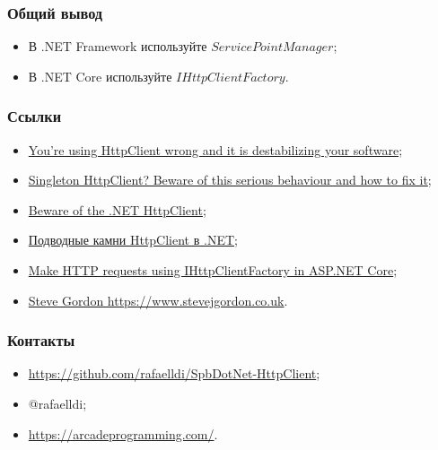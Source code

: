 \documentclass[17pt,aspectratio=169]{beamer}
\begin{document}
\begin{frame}
\frametitle{Общий вывод}
\begin{itemize}
	\item В .NET Framework используйте $ServicePointManager$;
	\item В .NET Core используйте $IHttpClientFactory$.
\end{itemize}
\end{frame}

\begin{frame}
\frametitle{Ссылки}
\begin{itemize}
	\item \href{https://aspnetmonsters.com/2016/08/2016-08-27-httpclientwrong/}{You're using HttpClient wrong and it is destabilizing your software};
	\item \href{https://byterot.blogspot.com/2016/07/singleton-httpclient-dns.html}{Singleton HttpClient? Beware of this serious behaviour and how to fix it};
	\item \href{https://nima-ara-blog.azurewebsites.net/beware-of-the-net-httpclient/}{Beware of the .NET HttpClient};
	\item \href{https://habr.com/en/post/424873/}{Подводные камни HttpClient в .NET};
	\item \href{https://docs.microsoft.com/en-us/aspnet/core/fundamentals/http-requests?view=aspnetcore-2.2}{Make HTTP requests using IHttpClientFactory in ASP.NET Core};
	\item \href{https://www.stevejgordon.co.uk}{Steve Gordon https://www.stevejgordon.co.uk}.
\end{itemize}
\end{frame}

\begin{frame}
\frametitle{Контакты}
\begin{itemize}
	\item \href{Слайды и примеры https://github.com/rafaelldi/SpbDotNet-HttpClient}{https://github.com/rafaelldi/SpbDotNet-HttpClient};
	\item @rafaelldi;
	\item \href{https://arcadeprogramming.com/}{https://arcadeprogramming.com/}.
\end{itemize}
\end{frame}
\end{document}
